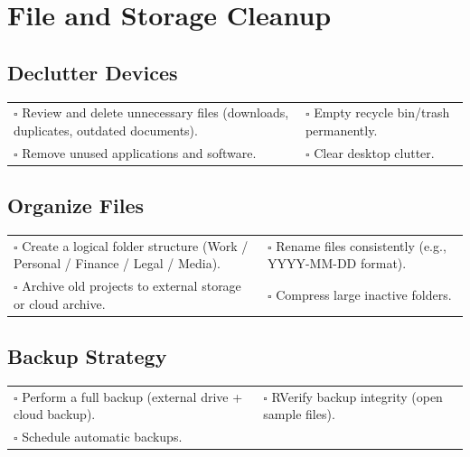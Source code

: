
\section{File and Storage Cleanup}
\label{sec:storage}

\subsection{Declutter Devices}

\begin{tabular}{p{9cm} p{8cm}}
$\square$ Review and delete unnecessary files (downloads, duplicates, outdated documents). & $\square$ Empty recycle bin/trash permanently. \\ 
$\square$ Remove unused applications and software. & $\square$ Clear desktop clutter. \\ 
\end{tabular}

\subsection{Organize Files}

\begin{tabular}{p{9cm} p{8cm}}
$\square$ Create a logical folder structure (Work / Personal / Finance / Legal / Media). & $\square$ Rename files consistently (e.g., YYYY-MM-DD format). \\ 
$\square$ Archive old projects to external storage or cloud archive. & $\square$ Compress large inactive folders. \\  
\end{tabular}

\subsection{Backup Strategy}

\begin{tabular}{p{9cm} p{8cm}}
$\square$ Perform a full backup (external drive + cloud backup). & $\square$ RVerify backup integrity (open sample files). \\ 
$\square$ Schedule automatic backups. & \\  
\end{tabular}

